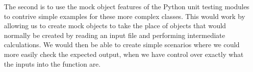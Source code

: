 \documentclass{article}
\begin{document}
The second is to use the mock object features of the Python unit testing modules to contrive simple examples for these more complex classes.
This would work by allowing us to create mock objects to take the place of objects that would normally be created by reading an input file and performing intermediate calculations.
We would then be able to create simple scenarios where we could more easily check the expected output, when we have control over exactly what the inputs into the function are.



\end{document}
